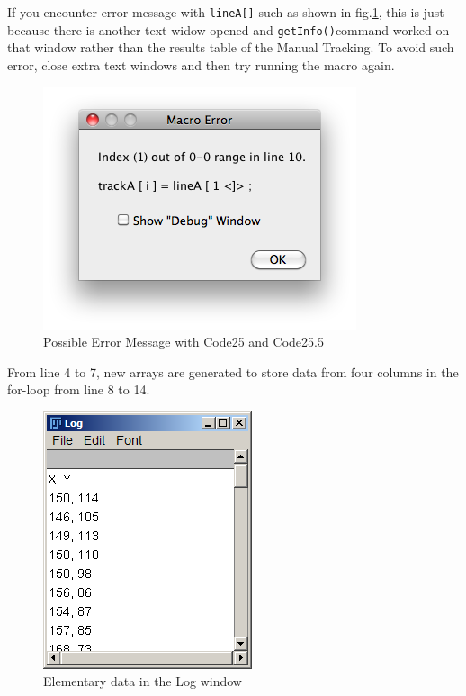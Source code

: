 \documentclass[11pt,a4paper,oneside]{report}
\newcommand{\ilcom}[1]{\texttt{\small#1}}
\begin{document}
If you encounter error message with \ilcom{lineA[]} such as shown in fig.\ref{fig:fig262_ErrorMessage}, this is just because there is another text widow opened and \ilcom{getInfo()}command worked on that window rather than the results table of the Manual Tracking. To avoid such error, close extra text windows and then try running the macro again. 
\begin{figure}[htbp]
\begin{center}
\includegraphics[scale=0.6]{fig/fig262_PossibleErrorMessage.png}
\caption{Possible Error Message with Code25 and Code25.5}
\label{fig:fig262_ErrorMessage}
\end{center}
\end{figure}

From line 4 to 7, new arrays are generated to store data from four columns in the for-loop from line 8 to 14. 

\begin{figure}[htbp]
\begin{center}
\includegraphics[scale=0.6]{fig/fig253_CoordinatesPrintedOut.png}
\caption{Elementary data in the Log window}
\label{fig:fig253_CoordinatesPrintedOut}
\end{center}
\end{figure}
\end{document}
